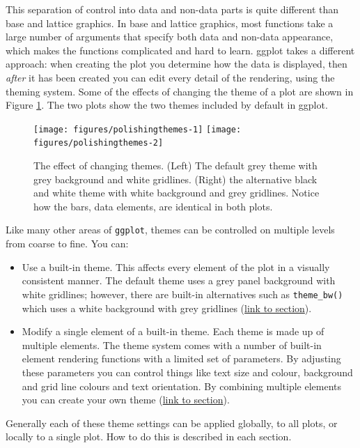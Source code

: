 This separation of control into data and non-data parts is quite
different than base and lattice graphics. In base and lattice graphics,
most functions take a large number of arguments that specify both data
and non-data appearance, which makes the functions complicated and hard
to learn. ggplot takes a different approach: when creating the plot you
determine how the data is displayed, then \emph{after} it has been
created you can edit every detail of the rendering, using the theming
system. Some of the effects of changing the theme of a plot are shown in
Figure \ref{fig:themes}. The two plots show the two themes included by
default in ggplot.

\begin{figure}

{\centering \texttt{[image: figures/polishingthemes-1]} \texttt{[image: figures/polishingthemes-2]} 

}

\caption{The effect of changing themes.  (Left) The default grey theme with grey background and white gridlines.  (Right) the alternative black and white theme with white background and grey gridlines.  Notice how the bars, data elements, are identical in both plots.\label{fig:themes}}
\end{figure}

Like many other areas of \texttt{ggplot}, themes can be controlled on
multiple levels from coarse to fine. You can:

\begin{itemize}
\itemsep1pt\parskip0pt
\item
  Use a built-in theme. This affects every element of the plot in a
  visually consistent manner. The default theme uses a grey panel
  background with white gridlines; however, there are built-in
  alternatives such as \texttt{theme\_bw()} which uses a white
  background with grey gridlines (\hyperref[sec:built-in]{link to
  section}).
\item
  Modify a single element of a built-in theme. Each theme is made up of
  multiple elements. The theme system comes with a number of built-in
  element rendering functions with a limited set of parameters. By
  adjusting these parameters you can control things like text size and
  colour, background and grid line colours and text orientation. By
  combining multiple elements you can create your own theme
  (\hyperref[sec:theme-elements]{link to section}).
\end{itemize}

Generally each of these theme settings can be applied globally, to all
plots, or locally to a single plot. How to do this is described in each
section.

